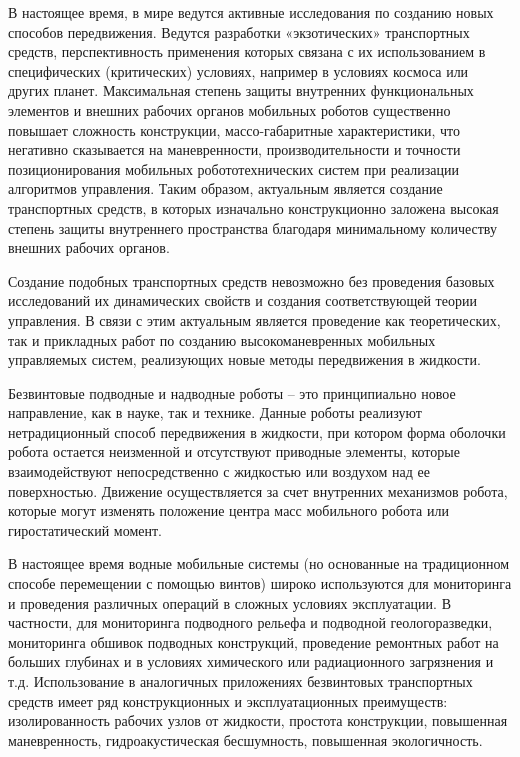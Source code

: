 
{\actuality} 

В настоящее время, в мире ведутся активные исследования по созданию новых способов передвижения. Ведутся разработки «экзотических» транспортных средств, перспективность применения которых связана с их использованием в специфических (критических) условиях, например в условиях космоса или других планет. Максимальная степень защиты внутренних функциональных элементов и внешних рабочих органов мобильных роботов существенно повышает сложность конструкции, массо-габаритные характеристики, что негативно сказывается на маневренности, производительности и точности позиционирования мобильных робототехнических систем при реализации алгоритмов управления. Таким образом, актуальным является создание транспортных средств, в которых изначально конструкционно заложена высокая степень защиты внутреннего пространства благодаря минимальному количеству внешних рабочих органов.

Создание подобных транспортных средств невозможно без проведения базовых исследований их динамических свойств и создания соответствующей теории управления. В связи с этим актуальным является проведение как теоретических, так и прикладных работ по созданию высокоманевренных мобильных управляемых систем, реализующих новые методы передвижения в жидкости.

Безвинтовые подводные и надводные роботы – это принципиально новое направление, как в науке, так и технике. Данные роботы реализуют нетрадиционный способ передвижения в жидкости, при котором форма оболочки робота остается неизменной и отсутствуют приводные элементы, которые взаимодействуют непосредственно с жидкостью или воздухом над ее поверхностью. Движение осуществляется за счет внутренних механизмов робота, которые могут изменять положение центра масс мобильного робота или гиростатический момент. 

В настоящее время водные мобильные системы (но основанные на традиционном способе перемещении с помощью винтов) широко используются для мониторинга и проведения различных операций в сложных условиях эксплуатации. В частности, для мониторинга подводного рельефа и подводной геологоразведки, мониторинга обшивок подводных конструкций, проведение ремонтных работ на больших глубинах и в условиях химического или радиационного загрязнения и т.д. Использование в аналогичных приложениях безвинтовых транспортных средств имеет ряд конструкционных и эксплуатационных преимуществ: изолированность рабочих узлов от жидкости, простота конструкции, повышенная маневренность, гидроакустическая бесшумность, повышенная экологичность.

